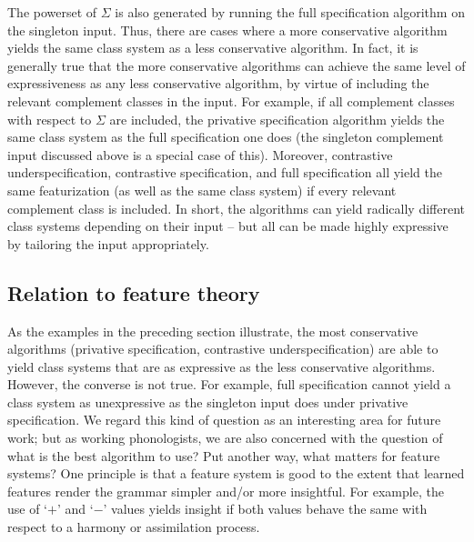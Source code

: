 \documentclass[11pt, oneside]{article}   	%
\begin{document}
The powerset of $\Sigma$ is also generated by running the full specification algorithm on the singleton input. Thus, there are cases where a more conservative algorithm yields the same class system as a less conservative algorithm. In fact, it is generally true that the more conservative algorithms can achieve the same level of expressiveness as any less conservative algorithm, by virtue of including the relevant complement classes in the input. For example, if all complement classes with respect to $\Sigma$ are included, the privative specification algorithm yields the same class system as the full specification one does (the singleton complement input discussed above is a special case of this). Moreover, contrastive underspecification, contrastive specification, and full specification all yield the same featurization (as well as the same class system) if every relevant complement class is included. In short, the algorithms can yield radically different class systems depending on their input -- but all can be made highly expressive by tailoring the input appropriately.

\subsection{Relation to feature theory}

As the examples in the preceding section illustrate, the most conservative algorithms (privative specification, contrastive underspecification) are able to yield class systems that are as expressive as the less conservative algorithms. However, the converse is not true. For example, full specification cannot yield a class system as unexpressive as the singleton input does under privative specification. We regard this kind of question as an interesting area for future work; but as working phonologists, we are also concerned with the question of what is the best algorithm to use? Put another way, what matters for feature systems? One principle is that a feature system is good to the extent that learned features render the grammar simpler and/or more insightful. For example, the use of `$+$' and `$-$' values yields insight if both values behave the same with respect to a harmony or assimilation process.
\end{document}
